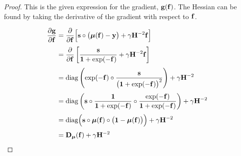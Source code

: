 \begin{proof}
    This is the given expression for the gradient, $\mathbf{g}(\mathbf{f})$. The Hessian can be found by taking the derivative of the gradient with respect to $\mathbf{f}$. 

    \begin{align*}
        \frac{\partial \mathbf{g}}{\partial \mathbf{f}}  &= \frac{\partial }{\partial \mathbf{f}} \Big[\mathbf{s} \circ \big(\boldsymbol{\mu}(\mathbf{f}) - \mathbf{y}\big) + \gamma \mathbf{H}^{-2} \mathbf{f} \Big] \\[0.1cm]
        &= \frac{\partial }{\partial \mathbf{f}} \left[\frac{\mathbf{s}}{\mathbf{1} + \exp(-\mathbf{f})} + \gamma \mathbf{H}^{-2} \mathbf{f} \right] \\[0.1cm]
        &= \text{\textup{diag}}\left(\exp(-\mathbf{f}) \circ \frac{\mathbf{s}}{\big(\mathbf{1} + \exp(-\mathbf{f})\big)^2}\right) + \gamma \mathbf{H}^{-2} \\[0.1cm]
        &= \text{\textup{diag}}\left(\mathbf{s} \circ \frac{\mathbf{1}}{\mathbf{1} + \exp(-\mathbf{f})} \circ \frac{\exp(-\mathbf{f})}{\mathbf{1} + \exp(-\mathbf{f})}\right) + \gamma \mathbf{H}^{-2} \\[0.1cm]
        &= \text{diag}\Big(\mathbf{s} \circ \boldsymbol{\mu}(\mathbf{f}) \circ \big(\mathbf{1} - \boldsymbol{\mu}(\mathbf{f})\big)\Big) + \gamma \mathbf{H}^{-2}\\[0.1cm]
        &= \mathbf{D}_{\boldsymbol{\mu}}(\mathbf{f}) + \gamma \mathbf{H}^{-2}
    \end{align*}
    

\end{proof}